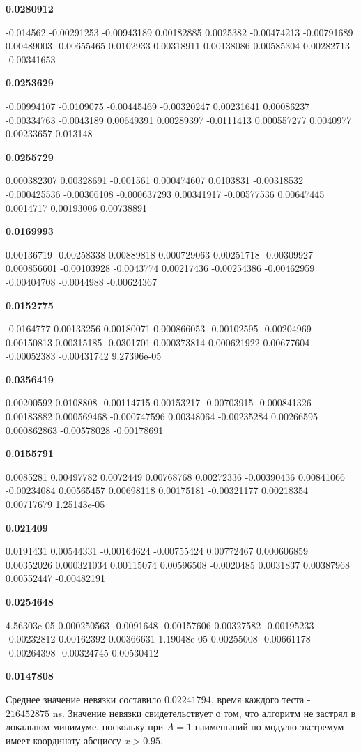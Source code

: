 \textbf{0.0280912}

-0.014562 -0.00291253 -0.00943189 0.00182885 0.0025382 -0.00474213 -0.00791689 0.00489003 -0.00655465 0.0102933 0.00318911 0.00138086 0.00585304 0.00282713 -0.00341653 

\textbf{0.0253629}

-0.00994107 -0.0109075 -0.00445469 -0.00320247 0.00231641 0.00086237 -0.00334763 -0.0043189 0.00649391 0.00289397 -0.0111413 0.000557277 0.0040977 0.00233657 0.013148 

\textbf{0.0255729}

0.000382307 0.00328691 -0.001561 0.000474607 0.0103831 -0.00318532 -0.000425536 -0.00306108 -0.000637293 0.00341917 -0.00577536 0.00647445 0.0014717 0.00193006 0.00738891 

\textbf{0.0169993}

0.00136719 -0.00258338 0.00889818 0.000729063 0.00251718 -0.00309927 0.000856601 -0.00103928 -0.0043774 0.00217436 -0.00254386 -0.00462959 -0.00404708 -0.0044988 -0.00624367 

\textbf{0.0152775}

-0.0164777 0.00133256 0.00180071 0.000866053 -0.00102595 -0.00204969 0.00150813 0.00315185 -0.0301701 0.000373814 0.000621922 0.00677604 -0.00052383 -0.00431742 9.27396e-05 

\textbf{0.0356419}

0.00200592 0.0108808 -0.00114715 0.00153217 -0.00703915 -0.000841326 0.00183882 0.000569468 -0.000747596 0.00348064 -0.00235284 0.00266595 0.000862863 -0.00578028 -0.00178691 

\textbf{0.0155791}

0.0085281 0.00497782 0.0072449 0.00768768 0.00272336 -0.00390436 0.00841066 -0.00234084 0.00565457 0.00698118 0.00175181 -0.00321177 0.00218354 0.00717679 1.25143e-05 

\textbf{0.021409}

0.0191431 0.00544331 -0.00164624 -0.00755424 0.00772467 0.000606859 0.00352026 0.000321034 0.00115074 0.00596508 -0.0020485 0.0031837 0.00387968 0.00552447 -0.00482191 

\textbf{0.0254648}

4.56303e-05 0.000250563 -0.0091648 -0.00157606 0.00327582 -0.00195233 -0.00232812 0.00162392 0.00366631 1.19048e-05 0.00255008 -0.00661178 -0.00264398 -0.00324745 0.00530412 

\textbf{0.0147808}

Среднее значение невязки составило $0.02241794$, время каждого теста - $216452875$ ns. Значение невязки свидетельствует о том, что алгоритм не застрял в локальном минимуме, поскольку при $A=1$ наименьший по модулю экстремум имеет координату-абсциссу $x > 0.95$.

